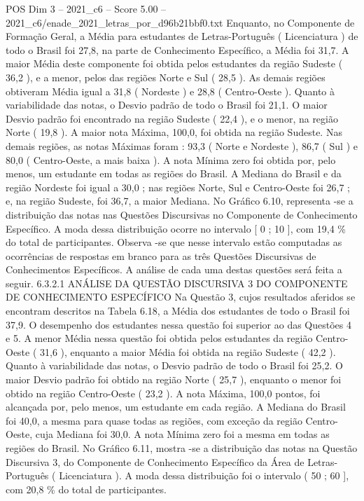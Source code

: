 \begin{textsample}{POS Dim 3 – 2021\_c6 – Score 5.00 – 2021\_c6/enade\_2021\_letras\_por\_d96b21bbf0.txt}
Enquanto, no Componente de Formação Geral, a Média para estudantes de Letras-Português ( Licenciatura ) de todo o Brasil foi 27,8, na parte de Conhecimento Específico, a Média foi 31,7.
A maior Média deste componente foi obtida pelos estudantes da região Sudeste ( 36,2 ), e a menor, pelos das regiões Norte e Sul ( 28,5 ).
As demais regiões obtiveram Média igual a 31,8 ( Nordeste ) e 28,8 ( Centro-Oeste ).
Quanto à variabilidade das notas, o Desvio padrão de todo o Brasil foi 21,1.
O maior Desvio padrão foi encontrado na região Sudeste ( 22,4 ), e o menor, na região Norte ( 19,8 ).
A maior nota Máxima, 100,0, foi obtida na região Sudeste.
Nas demais regiões, as notas Máximas foram : 93,3 ( Norte e Nordeste ), 86,7 ( Sul ) e 80,0 ( Centro-Oeste, a mais baixa ).
A nota Mínima zero foi obtida por, pelo menos, um estudante em todas as regiões do Brasil.
A Mediana do Brasil e da região Nordeste foi igual a 30,0 ; nas regiões Norte, Sul e Centro-Oeste foi 26,7 ; e, na região Sudeste, foi 36,7, a maior Mediana.
No Gráfico 6.10, representa -se a distribuição das notas nas Questões Discursivas no Componente de Conhecimento Específico.
A moda dessa distribuição ocorre no intervalo [ 0 ; 10 ], com 19,4 \% do total de participantes.
Observa -se que nesse intervalo estão computadas as ocorrências de respostas em branco para as três Questões Discursivas de Conhecimentos Específicos.
A análise de cada uma destas questões será feita a seguir. 6.3.2.1 ANÁLISE DA QUESTÃO DISCURSIVA 3 DO COMPONENTE DE CONHECIMENTO ESPECÍFICO Na Questão 3, cujos resultados aferidos se encontram descritos na Tabela 6.18, a Média dos estudantes de todo o Brasil foi 37,9.
O desempenho dos estudantes nessa questão foi superior ao das Questões 4 e 5.
A menor Média nessa questão foi obtida pelos estudantes da região Centro-Oeste ( 31,6 ), enquanto a maior Média foi obtida na região Sudeste ( 42,2 ).
Quanto à variabilidade das notas, o Desvio padrão de todo o Brasil foi 25,2.
O maior Desvio padrão foi obtido na região Norte ( 25,7 ), enquanto o menor foi obtido na região Centro-Oeste ( 23,2 ).
A nota Máxima, 100,0 pontos, foi alcançada por, pelo menos, um estudante em cada região.
A Mediana do Brasil foi 40,0, a mesma para quase todas as regiões, com exceção da região Centro-Oeste, cuja Mediana foi 30,0.
A nota Mínima zero foi a mesma em todas as regiões do Brasil.
No Gráfico 6.11, mostra -se a distribuição das notas na Questão Discursiva 3, do Componente de Conhecimento Específico da Área de Letras-Português ( Licenciatura ).
A moda dessa distribuição foi o intervalo ( 50 ; 60 ], com 20,8 \% do total de participantes.

\end{textsample}
